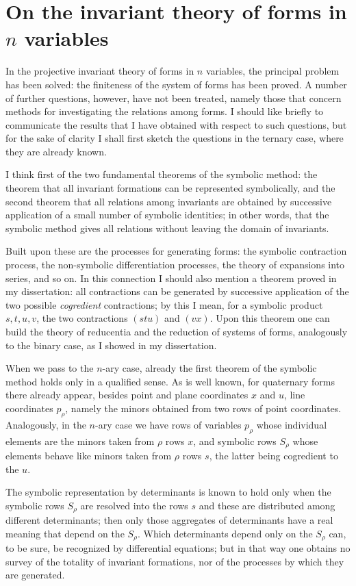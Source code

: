 \documentclass[11pt]{article}
\begin{document}
\section*{On the invariant theory of forms in $n$ variables}

In the projective invariant theory of forms in $n$ variables, the principal problem has been solved: the finiteness of the system of forms has been proved. A number of further questions, however, have not been treated, namely those that concern methods for investigating the relations among forms. I should like briefly to communicate the results that I have obtained with respect to such questions, but for the sake of clarity I shall first sketch the questions in the ternary case, where they are already known.

I think first of the two fundamental theorems of the symbolic method: the theorem that all invariant formations can be represented symbolically, and the second theorem that all relations among invariants are obtained by successive application of a small number of symbolic identities; in other words, that the symbolic method gives all relations without leaving the domain of invariants.

Built upon these are the processes for generating forms: the symbolic contraction process, the non-symbolic differentiation processes, the theory of expansions into series, and so on. In this connection I should also mention a theorem proved in my dissertation: all contractions can be generated by successive application of the two possible \emph{cogredient} contractions; by this I mean, for a symbolic product $s,t,u,v$, the two contractions $(stu)$ and $(vx)$. Upon this theorem one can build the theory of reducentia and the reduction of systems of forms, analogously to the binary case, as I showed in my dissertation.

When we pass to the $n$-ary case, already the first theorem of the symbolic method holds only in a qualified sense. As is well known, for quaternary forms there already appear, besides point and plane coordinates $x$ and $u$, line coordinates $p_\rho$, namely the minors obtained from two rows of point coordinates. Analogously, in the $n$-ary case we have rows of variables $p_\rho$ whose individual elements are the minors taken from $\rho$ rows $x$, and symbolic rows $S_\rho$ whose elements behave like minors taken from $\rho$ rows $s$, the latter being cogredient to the $u$.

The symbolic representation by determinants is known to hold only when the symbolic rows $S_\rho$ are resolved into the rows $s$ and these are distributed among different determinants; then only those aggregates of determinants have a real meaning that depend on the $S_\rho$. Which determinants depend only on the $S_\rho$ can, to be sure, be recognized by differential equations; but in that way one obtains no survey of the totality of invariant formations, nor of the processes by which they are generated.
\end{document}
